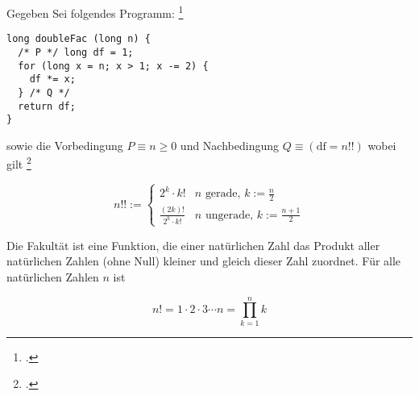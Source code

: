 \documentclass{lehramt-informatik-aufgabe}
\begin{document}

\let\wp=\liWpKalkuelOhneMathe

Gegeben Sei folgendes Programm:
\footcite[Thema 2 Teilaufgabe 2 Aufgabe 3]{examen:66116:2015:09}

\begin{verbatim}
long doubleFac (long n) {
  /* P */ long df = 1;
  for (long x = n; x > 1; x -= 2) {
    df *= x;
  } /* Q */
  return df;
}
\end{verbatim}

\noindent
sowie die Vorbedingung $P \equiv n \geq 0$ und Nachbedingung $Q \equiv
(\text{df} = n!!)$ wobei gilt
\footcite{sosy:ab:8}

\begin{equation*}
n!! :=
\begin{cases}
2^k \cdot k! & n\text{ gerade, }k := \frac{n}{2} \\
\frac{(2k)!}{2^k \cdot k!}& n\text{ ungerade, }k := \frac{n+1}{2}
\end{cases}
\end{equation*}

%

\begin{liExkurs}[Fakultät]
Die Fakultät ist eine Funktion, die einer natürlichen Zahl
das Produkt aller natürlichen Zahlen (ohne Null) kleiner und gleich
dieser Zahl zuordnet.
%
Für alle natürlichen Zahlen $n$ ist

\begin{displaymath}
 n! = 1 \cdot 2 \cdot 3 \dotsm n=\prod_{k=1}^{n}k
\end{displaymath}

\end{liExkurs}

%
\end{document}
